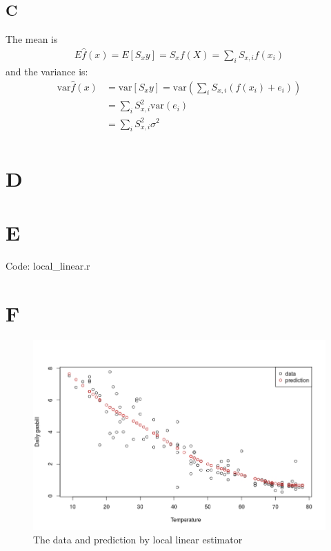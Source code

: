\documentclass{article}
\begin{document}
\subsection*{C}
The mean is
\begin{align*}
E \hat{f}(x) = E [ S_x y ] = S_x f(X) = \sum_i S_{x,i} f(x_i)
\end{align*}
and the variance is:
\begin{align*}
\mbox{var} \hat{f}(x) &= \mbox{var} [ S_x y ] = \mbox{var} \left( \sum_i S_{x,i} (f(x_i) + e_i) \right)\\
&= \sum_i S_{x,i}^2 \mbox{var}(e_i)\\
&= \sum_i S_{x,i}^2 \sigma^2\\
\end{align*}

\section*{D}

\section*{E}
\textsf{Code: local\_linear.r}

\section*{F}

\begin{figure}
\includegraphics[width=\textwidth]{util_plot.jpeg}
\caption{The data and prediction by local linear estimator}
\label{fig:util}
\end{figure}
\end{document}
